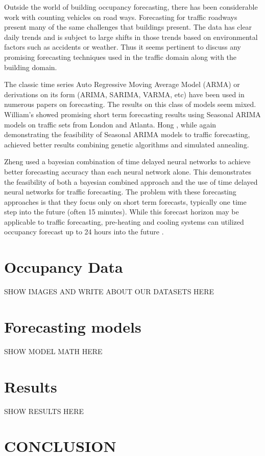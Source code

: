 \documentclass{acm_proc_article-sp}
\begin{document}
Outside the world of building occupancy forecasting, there has been considerable work with counting vehicles on road ways.  Forecasting for traffic roadways present many of the same challenges that buildings present.  The data has clear daily trends and is subject to large shifts in those trends based on environmental factors such as accidents or weather.  Thus it seems pertinent to discuss any promising forecasting techniques used in the traffic domain along with the building domain.

The classic time series Auto Regressive Moving Average Model (ARMA) or derivations on its form (ARIMA, SARIMA, VARMA, etc) have been used in numerous papers on forecasting.  The results on this class of models seem mixed.  William's \cite{Williams2003} showed promising short term forecasting results using Seasonal ARIMA models on traffic sets from London and Atlanta.  Hong \cite{Hong2011} , while again demonstrating the feasibility of Seasonal ARIMA models to traffic forecasting, achieved better results combining genetic algorithms and simulated annealing.  

Zheng \cite{Zheng2006} used a bayesian combination of time delayed neural networks to achieve better forecasting accuracy than each neural network alone.  This demonstrates the feasibility of both a bayesian combined approach and the use of time delayed neural networks for traffic forecasting.  The problem with these forecasting approaches is that they focus only on short term forecasts, typically one time step into the future (often 15 minutes).  While this forecast horizon may be applicable to traffic forecasting, pre-heating and cooling systems can utilized occupancy forecast up to 24 hours into the future \cite{Ma2010}.  

\section{Occupancy Data}
SHOW IMAGES AND WRITE ABOUT OUR DATASETS HERE


\section{Forecasting models}
SHOW MODEL MATH HERE

\section{Results}
SHOW RESULTS HERE

\section{CONCLUSION}

%
%
\balancecolumns
\end{document}
